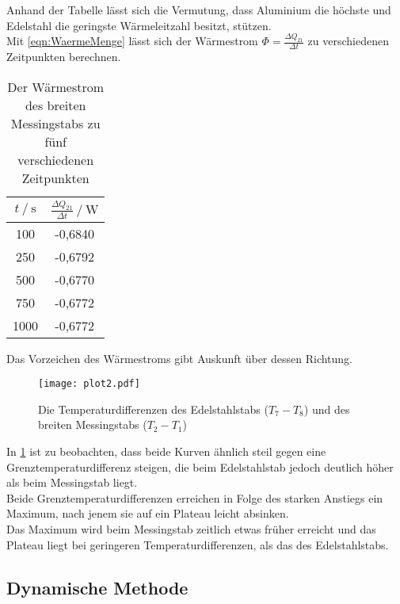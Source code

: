 Anhand der Tabelle lässt sich die Vermutung, dass Aluminium die höchste und 
Edelstahl die geringste Wärmeleitzahl besitzt, stützen. \\

Mit \ref{eqn:WaermeMenge} lässt sich der Wärmestrom $\Phi = \frac{\Delta Q_{21}}{\Delta t}$ zu verschiedenen Zeitpunkten berechnen. \\

\begin{table}[H]   %
  \centering
  \caption{Der Wärmestrom des breiten Messingstabs zu fünf verschiedenen Zeitpunkten}
  \begin{tabular}{cc}
    \toprule
    {$t \mathbin{/} \unit{\second}$} &
    {$\frac{\Delta Q_{21}}{\Delta t} \mathbin{/} \unit{\watt}$} \\
    \midrule
     100 & -0,6840 \\
     250 & -0,6792 \\
     500 & -0,6770 \\
     750 & -0,6772 \\
    1000 & -0,6772 \\   
    \bottomrule
  \end{tabular}
  \label{tab:TabelleA2}
\end{table}

Das Vorzeichen des Wärmestroms gibt Auskunft über dessen Richtung.\\


\begin{figure}[H]
  \centering
  \texttt{[image: plot2.pdf]}
  \caption{Die Temperaturdifferenzen des Edelstahlstabs ($T_7 - T_8$) und des breiten Messingstabs ($T_2 - T_1$)}
  \label{fig:plot2}
\end{figure}

In \ref{fig:plot2} ist zu beobachten, dass beide Kurven ähnlich 
steil gegen eine Grenztemperaturdifferenz steigen, die beim Edelstahlstab jedoch deutlich höher
als beim Messingstab liegt.\\ 
Beide Grenztemperaturdifferenzen erreichen in Folge des 
starken Anstiegs ein Maximum, nach jenem sie auf ein Plateau leicht absinken. \\
Das Maximum wird beim Messingstab zeitlich etwas früher erreicht und das Plateau liegt bei 
geringeren Temperaturdifferenzen, als das des Edelstahlstabs.\\


\subsection{Dynamische Methode}
\label{Dynamische Methode}

